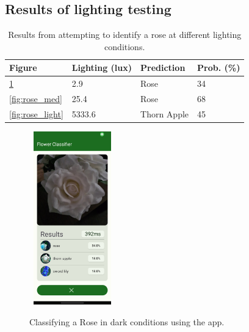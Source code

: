 \documentclass[12pt,a4paper]{report}
\begin{document}
\clearpage

\subsection{Results of lighting testing}
\label{subsec:lighting}

\begin{table}[h!]
    \begin{tabular}{ |l|l|l|l| }
        \hline
        Figure & Lighting (lux) & Prediction & Prob. (\%)\\
        \hline
        \ref{fig:rose_dark} & 2.9 & Rose & 34 \\
        \hline
        \ref{fig:rose_med} & 25.4 & Rose & 68 \\
        \hline
        \ref{fig:rose_light} & 5333.6 & Thorn Apple & 45 \\
        \hline
    \end{tabular}
    \caption{Results from attempting to identify a rose at different lighting conditions.}
    \label{table:lighting}
\end{table}

\begin{figure}[h]\
    \includegraphics[width=0.3\textwidth]{rose_light_1.jpg}
    \caption{Classifying a Rose in dark conditions using the app.}
    \label{fig:rose_dark}
\end{figure}
\end{document}
